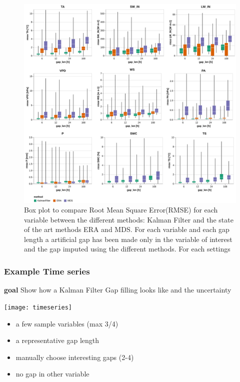 \documentclass{article}
\let\Oldsubsubsection\subsubsection
\renewcommand{\subsubsection}{\FloatBarrier\Oldsubsubsection}
\begin{document}
\begin{figure}
\includegraphics[width=\textwidth]{images/the_plot.png}
\caption{Box plot to compare Root Mean Square Error(RMSE) for each variable between the different methods: Kalman Filter and the state of the art methods ERA and MDS. For each variable and each gap length a artificial gap has been made only in the variable of interest and the gap imputed using the different methods. For each settings }
\end{figure}




\subsubsection{Example Time series}

\textbf{goal} Show how a Kalman Filter Gap filling looks like and the uncertainty 

\texttt{[image: timeseries]}

\begin{itemize}
    \item a few sample variables (max 3/4)
    \item a representative gap length
    \item manually choose interesting gaps (2-4)
    \item no gap in other variable
\end{itemize}
\end{document}
